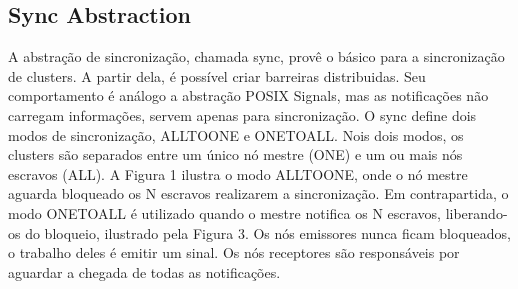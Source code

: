 


		\subsection{Sync Abstraction}
		\label{sec.sync-abs}

			A abstração de sincronização, chamada sync, provê o básico para a sincronização de clusters.
			A partir dela, é possível criar barreiras distribuidas.
			Seu comportamento é análogo a abstração POSIX Signals, mas as notificações não carregam informações, servem apenas para sincronização.
			O sync define dois modos de sincronização, ALLTOONE e ONETOALL.
			Nois dois modos, os clusters são separados entre um único nó mestre (ONE) e um ou mais nós escravos (ALL).
			A Figura 1 ilustra o modo ALLTOONE, onde o nó mestre aguarda bloqueado os N escravos realizarem a sincronização.
			Em contrapartida, o modo ONETOALL é utilizado quando o mestre notifica os N escravos, liberando-os do bloqueio, ilustrado pela Figura 3.
			Os nós emissores nunca ficam bloqueados, o trabalho deles é emitir um sinal.
			Os nós receptores são responsáveis por aguardar a chegada de todas as notificações.

